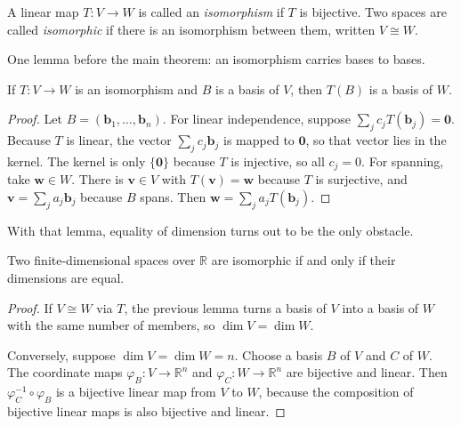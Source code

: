 
\begin{definisi}[Isomorphism]
A linear map $T\colon V\to W$ is called an \emph{isomorphism} if $T$ is bijective. Two spaces are called
\emph{isomorphic} if there is an isomorphism between them, written $V\cong W$.
\end{definisi}

One lemma before the main theorem: an isomorphism carries bases to bases.

\begin{lemma}
If $T\colon V\to W$ is an isomorphism and $B$ is a basis of $V$, then $T(B)$ is a basis of $W$.
\end{lemma}

\begin{proof}
Let $B=(\mathbf{b}_{1},\dots,\mathbf{b}_{n})$. For linear independence, suppose
$\sum_{j}c_{j}T(\mathbf{b}_{j})=\mathbf{0}$. Because $T$ is linear, the vector
$\sum_{j}c_{j}\mathbf{b}_{j}$ is mapped to $\mathbf{0}$, so that vector lies in the kernel. The kernel
is only $\{\mathbf{0}\}$ because $T$ is injective, so all $c_{j}=0$.
For spanning, take $\mathbf{w}\in W$. There is $\mathbf{v}\in V$ with $T(\mathbf{v})=\mathbf{w}$
because $T$ is surjective, and $\mathbf{v}=\sum_{j}a_{j}\mathbf{b}_{j}$ because $B$ spans.
Then
$\mathbf{w}=\sum_{j}a_{j}T(\mathbf{b}_{j})$.
\end{proof}

With that lemma, equality of dimension turns out to be the only obstacle.

\begin{teorema}
Two finite-dimensional spaces over $\mathbb{R}$ are isomorphic if and only if their dimensions are equal.
\end{teorema}

\begin{proof}
If $V\cong W$ via $T$, the previous lemma turns a basis of $V$ into a basis of $W$ with
the same number of members, so $\dim V=\dim W$.

Conversely, suppose $\dim V=\dim W=n$. Choose a basis $B$ of $V$ and $C$ of $W$. The coordinate
maps $\varphi_{B}\colon V\to\mathbb{R}^{n}$ and $\varphi_{C}\colon W\to\mathbb{R}^{n}$ are
bijective and linear. Then $\varphi_{C}^{-1}\circ\varphi_{B}$ is a bijective linear map
from
$V$ to $W$, because the composition of bijective linear maps is also bijective and linear.
\end{proof}

